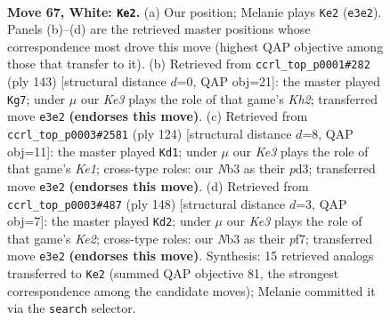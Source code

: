 \documentclass[11pt]{article}
\begin{document}
\clearpage

\begin{figure}[p]\centering
\begin{subfigure}{0.46\textwidth}\centering
\resizebox{\linewidth}{!}{%
\newchessgame
\chessboard[
  setfen={6k1/2P5/2r5/8/8/1N2K1B1/8/8 w - - 47 67},
  showmover=false,
  pgfstyle=straightmove, color=movearrow, markmove={e3-e2}
]}
\caption{}
\end{subfigure}\hfill
\begin{subfigure}{0.46\textwidth}\centering
\resizebox{\linewidth}{!}{%
\newchessgame
\chessboard[
  setfen={8/7k/3n4/3b4/1R6/1p6/5K2/8 b - - 17 72},
  showmover=false,
  pgfstyle=straightmove, color=movearrow, markmove={h7-g7}
]}
\caption{}
\end{subfigure}
\\[4pt]
\begin{subfigure}{0.46\textwidth}\centering
\resizebox{\linewidth}{!}{%
\newchessgame
\chessboard[
  setfen={8/4B3/8/8/4k2P/3p4/7r/4K3 w - - 17 63},
  showmover=false,
  pgfstyle=straightmove, color=movearrow, markmove={e1-d1}
]}
\caption{}
\end{subfigure}\hfill
\begin{subfigure}{0.46\textwidth}\centering
\resizebox{\linewidth}{!}{%
\newchessgame
\chessboard[
  setfen={8/1P3p2/2B5/4k3/8/1r6/4K3/8 w - - 23 75},
  showmover=false,
  pgfstyle=straightmove, color=movearrow, markmove={e2-d2}
]}
\caption{}
\end{subfigure}
\caption{\textbf{Move 67, White: \texttt{Ke2}.} (a) Our position; Melanie plays \texttt{Ke2} (\texttt{e3e2}). Panels (b)--(d) are the retrieved master positions whose correspondence most drove this move (highest QAP objective among those that transfer to it). (b) Retrieved from \texttt{ccrl\_top\_p0001\#282} (ply 143) [structural distance $d$=0, QAP obj=21]: the master played \texttt{Kg7}; under $\mu$ our \emph{Ke3} plays the role of that game's \emph{Kh2}; transferred move \texttt{e3e2} \textbf{(endorses this move)}. (c) Retrieved from \texttt{ccrl\_top\_p0003\#2581} (ply 124) [structural distance $d$=8, QAP obj=11]: the master played \texttt{Kd1}; under $\mu$ our \emph{Ke3} plays the role of that game's \emph{Ke1}; cross-type roles: our \emph{N}b3 as their \emph{p}d3; transferred move \texttt{e3e2} \textbf{(endorses this move)}. (d) Retrieved from \texttt{ccrl\_top\_p0003\#487} (ply 148) [structural distance $d$=3, QAP obj=7]: the master played \texttt{Kd2}; under $\mu$ our \emph{Ke3} plays the role of that game's \emph{Ke2}; cross-type roles: our \emph{N}b3 as their \emph{p}f7; transferred move \texttt{e3e2} \textbf{(endorses this move)}. Synthesis: 15 retrieved analogs transferred to \texttt{Ke2} (summed QAP objective 81, the strongest correspondence among the candidate moves); Melanie committed it via the \texttt{search} selector.}
\label{fig:thought-m132}
\end{figure}
\end{document}
